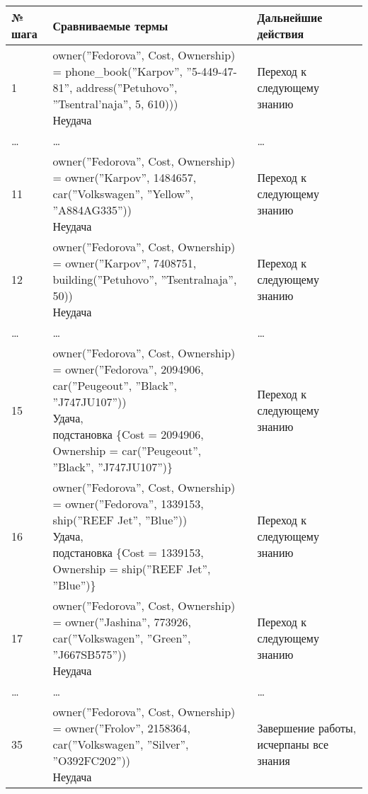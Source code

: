  \begin{center}
    \scriptsize
    \begin{tabular}{| l | l | l |}
        \hline
        № шага & Сравниваемые термы & Дальнейшие действия \\ \hline
        1      & \makecell[l]{owner(''Fedorova'', Cost, Ownership) \\ = phone\_book(''Karpov'', ''5-449-47-81'', address(''Petuhovo'', ''Tsentral'naja'', 5, 610))) \\ Неудача} & Переход к следующему знанию \\ \hline
        \dots & \dots & \dots \\ \hline
        11     & \makecell[l]{owner(''Fedorova'', Cost, Ownership) \\ = owner(''Karpov'', 1484657, car(''Volkswagen'', ''Yellow'', ''A884AG335'')) \\ Неудача} & Переход к следующему знанию \\ \hline
        12     & \makecell[l]{owner(''Fedorova'', Cost, Ownership) \\ = owner(''Karpov'', 7408751, building(''Petuhovo'', ''Tsentralnaja'', 50)) \\ Неудача} & Переход к следующему знанию \\ \hline
        \dots & \dots & \dots \\ \hline
        15     & \makecell[l]{owner(''Fedorova'', Cost, Ownership) \\ = owner(''Fedorova'', 2094906, car(''Peugeout'', ''Black'', ''J747JU107'')) \\ Удача,\\ подстановка \{Cost = 2094906, Ownership = car(''Peugeout'', ''Black'', ''J747JU107'')\}} & Переход к следующему знанию \\ \hline
        16     & \makecell[l]{owner(''Fedorova'', Cost, Ownership) \\ = owner(''Fedorova'', 1339153, ship(''REEF Jet'', ''Blue'')) \\ Удача, \\ подстановка \{Cost = 1339153, Ownership = ship(''REEF Jet'', ''Blue'')\}} & Переход к следующему знанию \\ \hline
        17     & \makecell[l]{owner(''Fedorova'', Cost, Ownership) \\ = owner(''Jashina'', 773926, car(''Volkswagen'', ''Green'', ''J667SB575'')) \\ Неудача} & Переход к следующему знанию \\ \hline
        \dots & \dots & \dots \\ \hline
        35     & \makecell[l]{owner(''Fedorova'', Cost, Ownership) \\ = owner(''Frolov'', 2158364, car(''Volkswagen'', ''Silver'', ''O392FC202'')) \\ Неудача} & Завершение работы, исчерпаны все знания \\ \hline
    \end{tabular}
 \end{center}

